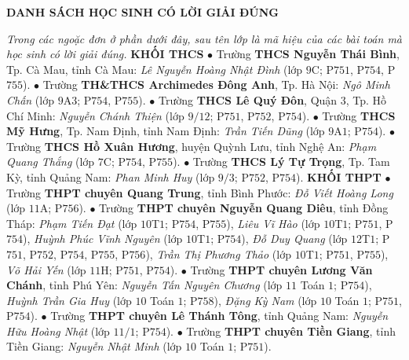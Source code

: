 \begin{center}
	\textbf{\color{thachthuctoanhoc}DANH SÁCH HỌC SINH CÓ LỜI GIẢI ĐÚNG}
\end{center}
\begin{multicols}{2}
	\textit{Trong các ngoặc đơn ở phần dưới đây, sau tên lớp là mã hiệu của các bài toán mà học sinh có lời giải đúng.}
	\vskip 0.05cm
	\textbf{\color{thachthuctoanhoc}KHỐI THCS}
	\vskip 0.05cm
	$\bullet$  Trường \textbf{\color{thachthuctoanhoc}THCS Nguyễn Thái Bình}, Tp. Cà Mau, tỉnh Cà Mau: \textit{Lê Nguyễn Hoàng Nhật Đình} (lớp $9$C; P$751$, P$754$, P$755$).
	\vskip 0.05cm
	$\bullet$  Trường \textbf{\color{thachthuctoanhoc}TH\&THCS Archimedes Đông Anh}, Tp. Hà Nội: \textit{Ngô Minh Chấn} (lớp $9$A$3$; P$754$, P$755$).
	\vskip 0.05cm
	$\bullet$  Trường \textbf{\color{thachthuctoanhoc}THCS Lê Quý Đôn}, Quận $3$, Tp. Hồ Chí Minh: \textit{Nguyễn Chánh Thiện} (lớp $9/12$; P$751$, P$752$, P$754$).
	\vskip 0.05cm
	$\bullet$  Trường \textbf{\color{thachthuctoanhoc}THCS Mỹ Hưng}, Tp. Nam Định, tỉnh Nam Định: \textit{Trần Tiến Dũng} (lớp $9$A$1$; P$754$).
	\vskip 0.05cm
	$\bullet$  Trường \textbf{\color{thachthuctoanhoc}THCS Hồ Xuân Hương}, huyện Quỳnh Lưu, tỉnh Nghệ An: \textit{Phạm Quang Thắng} (lớp $7$C; P$754$, P$755$).
	\vskip 0.05cm
	$\bullet$  Trường \textbf{\color{thachthuctoanhoc}THCS Lý Tự Trọng}, Tp. Tam Kỳ, tỉnh Quảng Nam: \textit{Phan Minh Huy} (lớp $9/3$; P$752$, P$754$).
	\vskip 0.05cm
	\textbf{\color{thachthuctoanhoc}KHỐI THPT}
	\vskip 0.05cm
	$\bullet$  Trường \textbf{\color{thachthuctoanhoc}THPT chuyên Quang Trung}, tỉnh Bình Phước: \textit{Đỗ Viết Hoàng Long} (lớp $11$A; P$756$).
	\vskip 0.05cm
	$\bullet$  Trường \textbf{\color{thachthuctoanhoc}THPT chuyên Nguyễn Quang Diêu}, tỉnh Đồng Tháp: \textit{Phạm Tiến Đạt} (lớp $10$T$1$; P$754$, P$755$), \textit{Liêu Vĩ Hào} (lớp $10$T$1$; P$751$, P$754$), \textit{Huỳnh Phúc Vĩnh Nguyên} (lớp $10$T$1$; P$754$), \textit{Đỗ Duy Quang} (lớp $12$T$1$; P$751$, P$752$, P$754$, P$755$, P$756$), \textit{Trần Thị Phương Thảo} (lớp $10$T$1$; P$751$, P$755$), \textit{Võ Hải Yến} (lớp $11$H; P$751$, P$754$).
	\vskip 0.05cm
	$\bullet$  Trường \textbf{\color{thachthuctoanhoc}THPT chuyên Lương Văn Chánh}, tỉnh Phú Yên: \textit{Nguyễn Tấn Nguyên Chương} (lớp $11$ Toán $1$; P$754$), \textit{Huỳnh Trần Gia Huy} (lớp $10$ Toán $1$; P$758$), \textit{Đặng Kỳ Nam} (lớp $10$ Toán $1$; P$751$, P$754$).
	\vskip 0.05cm
	$\bullet$  Trường \textbf{\color{thachthuctoanhoc}THPT chuyên Lê Thánh Tông}, tỉnh Quảng Nam: \textit{Nguyễn Hữu Hoàng Nhật} (lớp $11/1$; P$754$).
	\vskip 0.05cm
	$\bullet$  Trường \textbf{\color{thachthuctoanhoc}THPT chuyên Tiền Giang}, tỉnh Tiền Giang: \textit{Nguyễn Nhật Minh} (lớp $10$ Toán $1$; P$751$).
\end{multicols}

